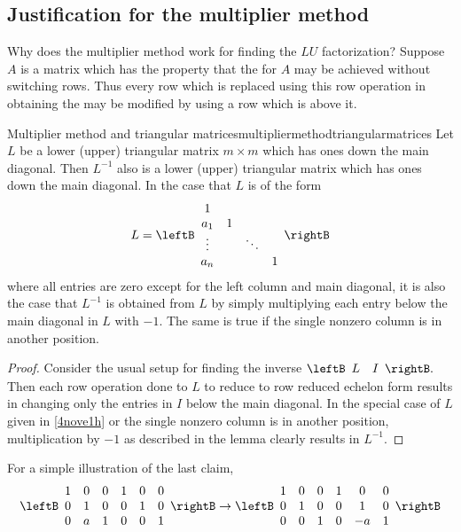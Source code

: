 \subsection{Justification for the  multiplier method}

Why does the multiplier method work for finding the $LU$ factorization?
Suppose $A$ is a matrix which has the property that the {\ef} for $A$ may be achieved without switching rows. Thus every row which is replaced using this
row operation in obtaining the {\ef} may be modified by using a row which
is above it.

\begin{lemma}{Multiplier method and triangular matrices}{multipliermethodtriangularmatrices}
Let $L$ be a lower (upper) triangular matrix $m\times m$
which has ones down the main diagonal. Then $L^{-1}$ also is a lower (upper)
triangular matrix which has ones down the main diagonal. In the case that $L$
is of the form 
\begin{equation}
L=\leftB 
\begin{array}{cccc}
1 &  &  &  \\ 
a_{1} & 1 &  &  \\ 
\vdots &  & \ddots &  \\ 
a_{n} &  &  & 1
\end{array}
\rightB  \label{4nove1h}
\end{equation}
where all entries are zero except for the left column and main diagonal, it
is also the case that $L^{-1}$ is obtained from $L$ by simply multiplying
each entry below the main diagonal in $L$ with $-1$. The same is true if the
single nonzero column is in another position.
\end{lemma}

\begin{proof}Consider the usual setup for finding the inverse $\leftB 
\begin{array}{cc}
L & I
\end{array}
\rightB .$ Then each row operation done to $L$ to reduce to row reduced
echelon form results in changing only the entries in $I$ below the main
diagonal. In the special case of $L$ given in \ref{4nove1h} or the single
nonzero column is in another position, multiplication by $-1$ as described
in the lemma clearly results in $L^{-1}$.
\end{proof}

For a simple illustration of the last claim, 
\begin{equation*}
\leftB 
\begin{array}{cccccc}
1 & 0 & 0 & 1 & 0 & 0 \\ 
0 & 1 & 0 & 0 & 1 & 0 \\ 
0 & a & 1 & 0 & 0 & 1
\end{array}
\rightB \rightarrow \leftB 
\begin{array}{cccccc}
1 & 0 & 0 & 1 & 0 & 0 \\ 
0 & 1 & 0 & 0 & 1 & 0 \\ 
0 & 0 & 1 & 0 & -a & 1%
\end{array}%
\rightB
\end{equation*}

